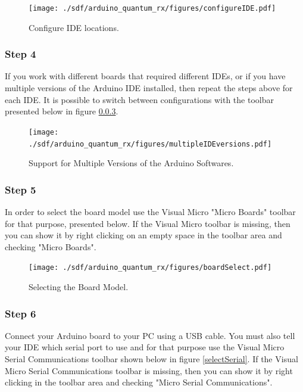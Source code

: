 \begin{refsection}
	\begin{figure}[H]
		\centering
		\texttt{[image: ./sdf/arduino\_quantum\_rx/figures/configureIDE.pdf]}
		\caption{Configure IDE locations.}
		\label{configureIDE}
	\end{figure}
	
	\subsubsection{Step 4}
	If you work with different boards that required different IDEs, or if you have multiple versions of the Arduino IDE installed, then repeat the steps above for each IDE. It is possible to switch between configurations with the toolbar presented below in figure \ref{}.
	
	\begin{figure}[H]
		\centering
		\texttt{[image: ./sdf/arduino\_quantum\_rx/figures/multipleIDEversions.pdf]}
		\caption{Support for Multiple Versions of the Arduino Softwares.}
		\label{multipleIDEversions}
	\end{figure}
	
	
	\subsubsection{Step 5}
	
	In order to select the board model use the Visual Micro "Micro Boards" toolbar for that purpose, presented below. If the Visual Micro toolbar is missing, then you can show it by right clicking on an empty space in the toolbar area and checking "Micro Boards".
	
	
	\begin{figure}[H]
		\centering
		\texttt{[image: ./sdf/arduino\_quantum\_rx/figures/boardSelect.pdf]}
		\caption{Selecting the Board Model.}
		\label{boardSelect}
	\end{figure}
	
	\subsubsection{Step 6}
	
	Connect your Arduino board to your PC using a USB cable. You must also tell your IDE which serial port to use and for that purpose use the Visual Micro Serial Communications toolbar shown below in figure \ref{selectSerial}. If the Visual Micro Serial Communications toolbar is missing, then you can show it by right clicking in the toolbar area and checking "Micro Serial Communications".
	

\end{refsection}
